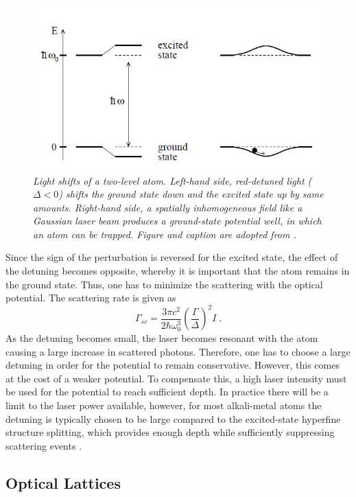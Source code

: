\begin{figure}[!t]
	\centering
	\includegraphics[width=0.5\columnwidth]{Figures/acstark.JPG} 
	\caption{\textit{Light shifts of a two-level atom. Left-hand side,
		red-detuned light ($\Delta < 0$) shifts the ground state down and the
		excited state up by same amounts. Right-hand side, a spatially
		inhomogeneous field like a Gaussian laser beam produces a
		ground-state potential well, in which an atom can be trapped. Figure and 		caption are adopted from \cite{grimm}.}}
	\label{fig:ac_stark} 
\end{figure}
Since the sign of the perturbation is reversed for the excited state, the effect of the detuning becomes opposite, whereby it is important that the atom remains in the ground state. Thus, one has to minimize the scattering with the optical potential. The scattering rate is given as \cite{grimm}
\begin{equation}
	\Gamma_{sc} = \frac{3 \pi c^2}{2 \hbar \omega_{0}^3}  \left( \frac{\Gamma}{\Delta} \right) ^2 I \; .
\end{equation}
As the detuning becomes small, the laser becomes resonant with the atom causing a large increase in scattered photons. Therefore, one has to choose a large detuning in order for the potential to remain conservative. However, this comes at the cost of a weaker potential. To compensate this, a high laser intensity must be used for the potential to reach sufficient depth. In practice there will be a limit to the laser power available, however, for most alkali-metal atoms the detuning is typically chosen to be large compared to the excited-state hyperfine structure splitting, which provides enough depth while sufficiently suppressing scattering events \cite{manybodyBloch}. 


\subsection{Optical Lattices}

